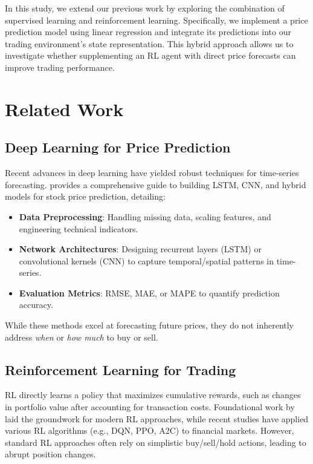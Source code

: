 \documentclass[11pt]{article}
\begin{document}
In this study, we extend our previous work by exploring the combination of supervised learning and reinforcement learning. Specifically, we implement a price prediction model using linear regression and integrate its predictions into our trading environment's state representation. This hybrid approach allows us to investigate whether supplementing an RL agent with direct price forecasts can improve trading performance.

\section{Related Work}
\subsection{Deep Learning for Price Prediction}
Recent advances in deep learning have yielded robust techniques for time-series forecasting. \citet{rana_2023_deep} provides a comprehensive guide to building LSTM, CNN, and hybrid models for stock price prediction, detailing:
\begin{itemize}
  \item \textbf{Data Preprocessing}: Handling missing data, scaling features, and engineering technical indicators.
  \item \textbf{Network Architectures}: Designing recurrent layers (LSTM) or convolutional kernels (CNN) to capture temporal/spatial patterns in time-series.
  \item \textbf{Evaluation Metrics}: RMSE, MAE, or MAPE to quantify prediction accuracy.
\end{itemize}
While these methods excel at forecasting future prices, they do not inherently address \emph{when} or \emph{how much} to buy or sell.

\subsection{Reinforcement Learning for Trading}
RL directly learns a policy that maximizes cumulative rewards, such as changes in portfolio value after accounting for transaction costs. Foundational work by \citet{sutton_2018_irl} laid the groundwork for modern RL approaches, while recent studies have applied various RL algorithms (e.g., DQN, PPO, A2C) to financial markets. However, standard RL approaches often rely on simplistic buy/sell/hold actions, leading to abrupt position changes.
\end{document}
